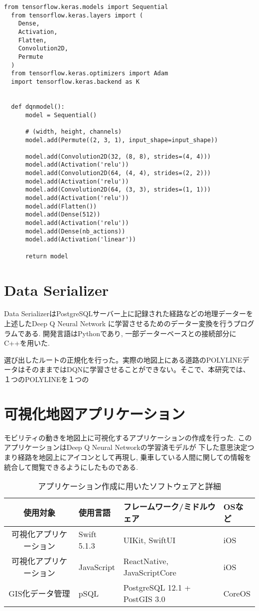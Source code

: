 \begin{lstlisting}[caption = DQNの深層学習部分を形成するモデル, label = program1]
  from tensorflow.keras.models import Sequential
  from tensorflow.keras.layers import (
    Dense,
    Activation,
    Flatten,
    Convolution2D,
    Permute
  )
  from tensorflow.keras.optimizers import Adam
  import tensorflow.keras.backend as K
  
  
  def dqnmodel():
      model = Sequential()
  
      # (width, height, channels)
      model.add(Permute((2, 3, 1), input_shape=input_shape))
  
      model.add(Convolution2D(32, (8, 8), strides=(4, 4)))
      model.add(Activation('relu'))
      model.add(Convolution2D(64, (4, 4), strides=(2, 2)))
      model.add(Activation('relu'))
      model.add(Convolution2D(64, (3, 3), strides=(1, 1)))
      model.add(Activation('relu'))
      model.add(Flatten())
      model.add(Dense(512))
      model.add(Activation('relu'))
      model.add(Dense(nb_actions))
      model.add(Activation('linear'))
  
      return model  
\end{lstlisting}
  
  

\section{Data Serializer}

Data SerializerはPostgreSQLサーバー上に記録された経路などの地理データーを上述したDeep Q Neural Network
に学習させるためのデーター変換を行うプログラムである.
開発言語はPythonであり, 一部データーベースとの接続部分にC++を用いた.

選び出したルートの正規化を行った。実際の地図上にある道路のPOLYLINEデータはそのままではDQNに学習させることができない。そこで、本研究では、１つのPOLYLINEを１つの

\section{可視化地図アプリケーション}

モビリティの動きを地図上に可視化するアプリケーションの作成を行った. このアプリケーションはDeep Q Neural Networkの学習済モデルが
下した意思決定つまり経路を地図上にアイコンとして再現し, 乗車している人間に関しての情報を統合して閲覧できるようにしたものである.


\begin{table}[h]
  \caption{アプリケーション作成に用いたソフトウェアと詳細}
  \label{table:SpeedOfLight}
  \centering
  \begin{tabular}{clll}
    \hline
      使用対象 & 使用言語 & フレームワーク/ミドルウェア & OSなど \\
      \hline \hline
      可視化アプリケーション & Swift 5.1.3 & UIKit, SwiftUI & iOS \\
      可視化アプリケーション & JavaScript & ReactNative, JavaScriptCore & iOS \\
      GIS化データ管理 & pSQL & PostgreSQL 12.1 + PostGIS 3.0 & CoreOS \\
    \hline
  \end{tabular}
\end{table}


